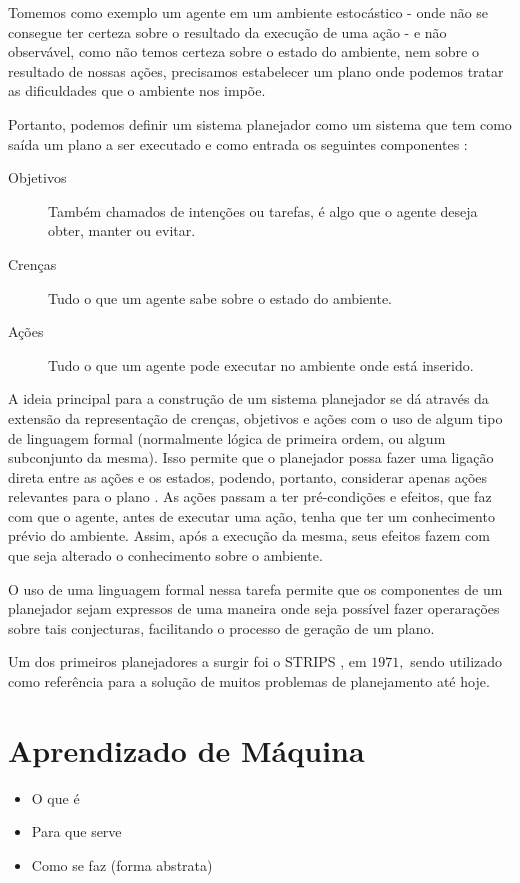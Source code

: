 Tomemos como exemplo um agente em um ambiente estocástico - onde não se consegue
ter certeza sobre o resultado da execução de uma ação - e não observável, como
não temos certeza sobre o estado do ambiente, nem sobre o resultado de nossas
ações, precisamos estabelecer um plano onde podemos tratar as dificuldades que o
ambiente nos impõe.

Portanto, podemos definir um sistema planejador como um sistema que tem como
saída um plano a ser executado e como entrada os seguintes componentes
\cite{Woolridge:2001:IMS:559667}:

\begin{description} \item [Objetivos] Também chamados de intenções ou tarefas, é
algo que o agente deseja obter, manter ou evitar.  \item [Crenças] Tudo o que um
agente sabe sobre o estado do ambiente.  \item [Ações] Tudo o que um agente pode
executar no ambiente onde está inserido.
\end{description}
A ideia principal para a construção de um sistema planejador se dá através da
extensão da representação de crenças, objetivos e ações com o uso de algum tipo
de linguagem formal (normalmente lógica de primeira ordem, ou algum subconjunto
da mesma). Isso permite que o planejador possa fazer uma ligação direta entre as
ações e os estados, podendo, portanto, considerar apenas ações relevantes para o
plano \cite{Russell:1995:AIM:193191}. As ações passam a ter pré-condições e
efeitos, que faz com que o agente, antes de executar uma ação, tenha que ter um
conhecimento prévio do ambiente. Assim, após a execução da mesma, seus efeitos
fazem com que seja alterado o conhecimento sobre o ambiente.

O uso de uma linguagem formal nessa tarefa permite que os componentes de um
planejador sejam expressos de uma maneira onde seja possível fazer operarações
sobre tais conjecturas, facilitando o processo de geração de um plano.

Um dos primeiros planejadores a surgir foi o STRIPS \cite{STRIPSNEWAPPROACH}, em
$1971,$ sendo utilizado como referência para a solução de muitos problemas de
planejamento até hoje.

\section{Aprendizado de Máquina}

\begin{itemize} \item O que é \item Para que serve \item Como se faz (forma
abstrata) \end{itemize}

